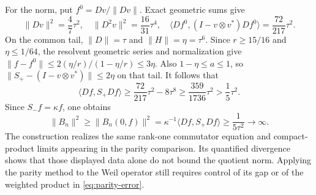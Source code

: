 For the norm, put $f^0=Dv/\|Dv\|$. Exact geometric sums give
\[
 \|Dv\|^2=\frac47\tau^2,\quad
 \|D^2v\|^2=\frac{16}{31}\tau^4,\quad
 \langle Df^0,(I-v\otimes v^*)Df^0\rangle
       =\frac{72}{217}\tau^2.
\]
On the common tail, $\|D\|=\tau$ and $\|H\|=\eta=\tau^6$.
Since $r\ge15/16$ and $\eta\le1/64$, the resolvent geometric series
and normalization give
$\|f-f^0\|\le2(\eta/r)/(1-\eta/r)\le3\eta$.
Also $1-\eta\le a\le1$, so
$\|S_+-(I-v\otimes v^*)\|\le2\eta$ on that tail.
It follows that
\[
 \langle Df,S_+Df\rangle
 \ge\frac{72}{217}\tau^2-8\tau^8
 \ge\frac{359}{1736}\tau^2>\frac15\tau^2.
\]
Since $S_-f=\kappa f$, one obtains
\[
 \|B_n\|^2\ge\|B_n(0,f)\|^2
       =\kappa^{-1}\langle Df,S_+Df\rangle
       \ge\frac1{5\tau^2}\longrightarrow\infty.
\]
The construction realizes the same rank-one commutator equation and
compact-product limits appearing in the parity comparison. Its
quantified divergence shows that those displayed data alone do not
bound the quotient norm. Applying the parity method to the Weil
operator still requires control of its gap or of the weighted product
in \eqref{eq:parity-error}.
